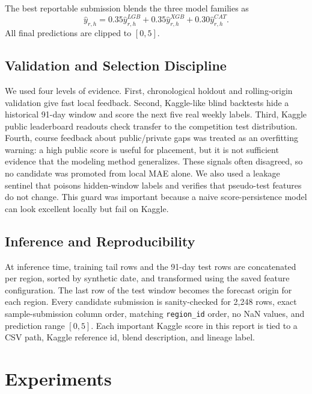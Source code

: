 \documentclass[conference]{IEEEtran}
\begin{document}
The best reportable submission blends the three model families as
\begin{equation}
  \hat{y}_{r,h}=0.35\hat{y}^{LGB}_{r,h}
  +0.35\hat{y}^{XGB}_{r,h}+0.30\hat{y}^{CAT}_{r,h}.
\end{equation}
All final predictions are clipped to $[0,5]$.

\subsection{Validation and Selection Discipline}
We used four levels of evidence. First, chronological holdout and rolling-origin
validation give fast local feedback. Second, Kaggle-like blind backtests hide a
historical 91-day window and score the next five real weekly labels. Third,
Kaggle public leaderboard readouts check transfer to the competition test
distribution. Fourth, course feedback about public/private gaps was treated as
an overfitting warning: a high public score is useful for placement, but it is
not sufficient evidence that the modeling method generalizes. These signals
often disagreed, so no candidate was promoted from local MAE alone. We also used
a leakage sentinel that poisons hidden-window labels and verifies that
pseudo-test features do not change. This guard was important because a naive
score-persistence model can look excellent locally but fail on Kaggle.

\subsection{Inference and Reproducibility}
At inference time, training tail rows and the 91-day test rows are concatenated
per region, sorted by synthetic date, and transformed using the saved feature
configuration. The last row of the test window becomes the forecast origin for
each region. Every candidate submission is sanity-checked for 2,248 rows, exact
sample-submission column order, matching \texttt{region\_id} order, no NaN
values, and prediction range $[0,5]$. Each important Kaggle score in this
report is tied to a CSV path, Kaggle reference id, blend description, and
lineage label.

\section{Experiments}
\end{document}
